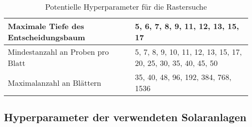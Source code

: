 \documentclass[12pt, a4paper]{article}
\begin{document}
\begin{table}[H]
\begin{center}

\begin{tabular}{| p{4cm} | p{8cm} |}

\hline
Maximale Tiefe des Entscheidungsbaum & 5, 6, 7, 8, 9, 11, 12, 13, 15, 17 \\ \hline
Mindestanzahl an \newline Proben pro Blatt & 5, 7, 8, 9, 10, 11, 12, 13, 15, 17, 20, 25, 30, 35, 40, 45, 50 \\ \hline
Maximalanzahl \newline an Blättern & 35, 40, 48, 96, 192, 384, 768, 1536 \\ \hline

\end{tabular}
\end{center}

\caption{Potentielle Hyperparameter für die Rastersuche}
\label{tab:gridsearch}
\end{table}

\subsection{Hyperparameter der verwendeten Solaranlagen}
\end{document}
